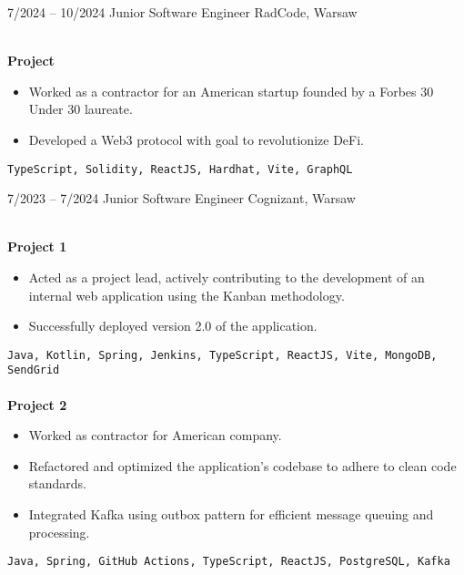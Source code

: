 \documentclass[9pt]{developercv} %
\begin{document}
\vspace{-5 pt}
\begin{entrylist}
    \entry
        {7/2024 -- 10/2024}
		{Junior Software Engineer}
		{RadCode, Warsaw}
		{\\
        \textbf{\small Project}\\
        \vspace{-10pt}
        \begin{itemize}[noitemsep,topsep=0pt,parsep=0pt,partopsep=0pt, leftmargin=-1pt]
            \item Worked as a contractor for an American startup founded by a Forbes 30 Under 30 laureate.
            \item Developed a Web3 protocol with goal to revolutionize DeFi.
        \end{itemize}
        \vspace{2mm}
        \texttt{TypeScript, Solidity, ReactJS, Hardhat, Vite, GraphQL}
        }
	\entry
        {7/2023 -- 7/2024}
		{Junior Software Engineer}
		{Cognizant, Warsaw}
		{\\
        \textbf{\small Project 1}\\
        \vspace{-10pt}
        \begin{itemize}[noitemsep,topsep=0pt,parsep=0pt,partopsep=0pt, leftmargin=-1pt]
            \item Acted as a project lead, actively contributing to the development of an internal web application using the Kanban methodology.
            \item Successfully deployed version 2.0 of the application.
        \end{itemize}
        \vspace{2mm}
        \texttt{Java, Kotlin, Spring, Jenkins, TypeScript, ReactJS, Vite, MongoDB, SendGrid}
        \\\\
        \textbf{\small Project 2}\\
        \vspace{-10pt}
        \begin{itemize}[noitemsep,topsep=0pt,parsep=0pt,partopsep=0pt, leftmargin=-1pt]
            \item Worked as contractor for American company.
            \item Refactored and optimized the application's codebase to adhere to clean code standards.
            \item Integrated Kafka using outbox pattern for efficient message queuing and processing.
        \end{itemize}
        \vspace{2mm}
        \texttt{Java, Spring, GitHub Actions, TypeScript, ReactJS, PostgreSQL, Kafka}}

\end{entrylist}
\end{document}
